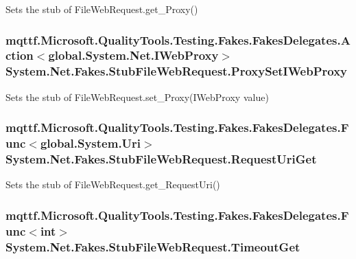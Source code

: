 Sets the stub of File\-Web\-Request.\-get\-\_\-\-Proxy()

\hypertarget{class_system_1_1_net_1_1_fakes_1_1_stub_file_web_request_a777650151b4cd307bf17d8867929b832}{
\subsubsection[{Proxy\-Set\-I\-Web\-Proxy}]{\setlength{\rightskip}{0pt plus 5cm}mqttf.\-Microsoft.\-Quality\-Tools.\-Testing.\-Fakes.\-Fakes\-Delegates.\-Action$<$global.\-System.\-Net.\-I\-Web\-Proxy$>$ System.\-Net.\-Fakes.\-Stub\-File\-Web\-Request.\-Proxy\-Set\-I\-Web\-Proxy}}\label{class_system_1_1_net_1_1_fakes_1_1_stub_file_web_request_a777650151b4cd307bf17d8867929b832}


Sets the stub of File\-Web\-Request.\-set\-\_\-\-Proxy(\-I\-Web\-Proxy value)

\hypertarget{class_system_1_1_net_1_1_fakes_1_1_stub_file_web_request_a09f32930ded46781905a6caeaa22918f}{
\subsubsection[{Request\-Uri\-Get}]{\setlength{\rightskip}{0pt plus 5cm}mqttf.\-Microsoft.\-Quality\-Tools.\-Testing.\-Fakes.\-Fakes\-Delegates.\-Func$<$global.\-System.\-Uri$>$ System.\-Net.\-Fakes.\-Stub\-File\-Web\-Request.\-Request\-Uri\-Get}}\label{class_system_1_1_net_1_1_fakes_1_1_stub_file_web_request_a09f32930ded46781905a6caeaa22918f}


Sets the stub of File\-Web\-Request.\-get\-\_\-\-Request\-Uri()

\hypertarget{class_system_1_1_net_1_1_fakes_1_1_stub_file_web_request_abff08b2091a4827bc1f266e2b228d9a1}{
\subsubsection[{Timeout\-Get}]{\setlength{\rightskip}{0pt plus 5cm}mqttf.\-Microsoft.\-Quality\-Tools.\-Testing.\-Fakes.\-Fakes\-Delegates.\-Func$<$int$>$ System.\-Net.\-Fakes.\-Stub\-File\-Web\-Request.\-Timeout\-Get}}\label{class_system_1_1_net_1_1_fakes_1_1_stub_file_web_request_abff08b2091a4827bc1f266e2b228d9a1}


